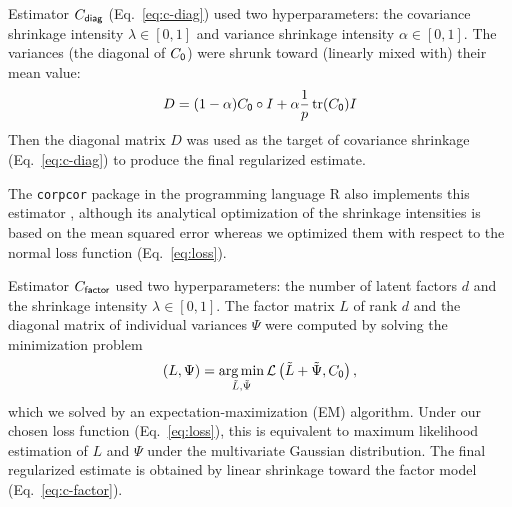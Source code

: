 \documentclass[10pt]{article}
\DeclareMathOperator{\Tr}{tr}
\newcommand{\loss}[1]{\mathcal L\left(#1\right)}
\DeclareMathOperator*{\argmin}{arg\,min}
\begin{document}
Estimator $C_{\sf diag}$ (Eq.~\ref{eq:c-diag})  used two hyperparameters: the covariance shrinkage intensity $\lambda \in [0,1]$ and variance shrinkage intensity $\alpha \in [0,1]$.  The variances (the diagonal of $C_{\sf 0}$) were shrunk toward (linearly mixed with) their mean value:
\begin{equation}
D = (1-\alpha)C_{\sf 0}\circ I + \alpha \frac 1 p \Tr(C_{\sf 0}) I
\end{equation}
Then the diagonal matrix $D$ was used as the target of covariance shrinkage (Eq.~\ref{eq:c-diag}) to produce the final regularized estimate.

The {\tt corpcor} package in the programming language R also implements this estimator \cite{Schafer:2010}, although its analytical optimization of the shrinkage intensities is based on the mean squared error whereas we optimized them with respect to the normal loss function (Eq.~\ref{eq:loss}).

Estimator $C_{\sf factor}$ used two hyperparameters: the number of latent factors $d$ and the shrinkage intensity $\lambda \in [0, 1]$.  
The factor matrix $L$ of rank $d$ and the diagonal matrix of individual variances $\Psi$ were computed by solving the minimization problem
\begin{equation}
(L,\Psi) = \argmin\limits_{\tilde L,\tilde\Psi} \loss{\tilde L + \tilde\Psi,C_{\sf 0}},
\end{equation}
which we solved by an expectation-maximization (EM) algorithm.  Under our chosen loss function (Eq.~\ref{eq:loss}), this is equivalent to maximum likelihood estimation of $L$ and $\Psi$ under the multivariate Gaussian distribution.  The final regularized estimate is obtained by linear shrinkage toward the factor model (Eq.~\ref{eq:c-factor}). 
\end{document}
